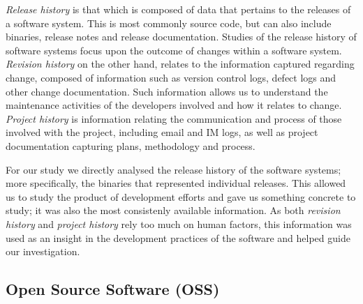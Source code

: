\emph{Release history} is that which is composed of data that pertains to the releases of a software system. This is most commonly source code, but can also include binaries, release notes and release documentation. Studies of the release history of software systems focus upon the outcome of changes within a software system. \emph{Revision history} on the other hand, relates to the information captured regarding change, composed of information such as version control logs, defect logs and other change documentation. Such information allows us to understand the maintenance activities of the developers involved and how it relates to change. \emph{Project history} is information relating the communication and process of those involved with the project, including email and IM logs, as well as project documentation capturing plans, methodology and process.


For our study we directly analysed the release history of the software systems; more specifically, the binaries that represented individual releases. This allowed us to study the product of development efforts and gave us something concrete to study; it was also the most consistenly available information. As both \emph{revision history} and \emph{project history} rely too much on human factors, this information was used as an insight in the development practices of the software and helped guide our investigation.


\subsection{Open Source Software (OSS)} %
\label{sub:open_source_software_oss_}

% 
% 
% 
% 




